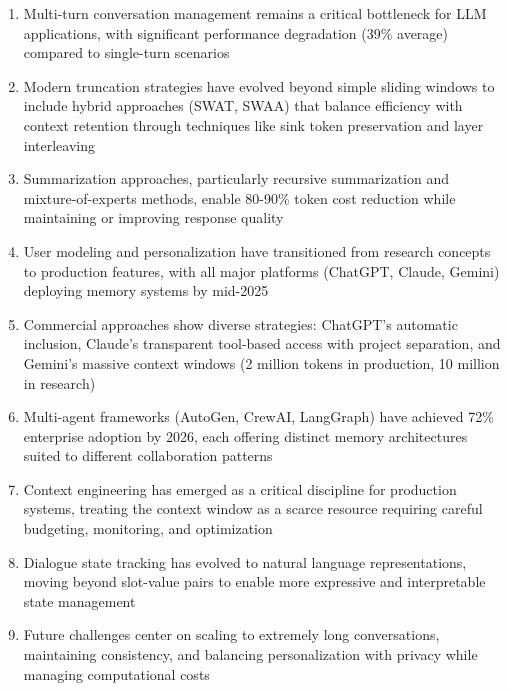 \documentclass[11pt,letterpaper]{article}
\begin{document}
\begin{enumerate}[leftmargin=*]
    \item Multi-turn conversation management remains a critical bottleneck for LLM applications, with significant performance degradation (39\% average) compared to single-turn scenarios

    \item Modern truncation strategies have evolved beyond simple sliding windows to include hybrid approaches (SWAT, SWAA) that balance efficiency with context retention through techniques like sink token preservation and layer interleaving

    \item Summarization approaches, particularly recursive summarization and mixture-of-experts methods, enable 80-90\% token cost reduction while maintaining or improving response quality

    \item User modeling and personalization have transitioned from research concepts to production features, with all major platforms (ChatGPT, Claude, Gemini) deploying memory systems by mid-2025

    \item Commercial approaches show diverse strategies: ChatGPT's automatic inclusion, Claude's transparent tool-based access with project separation, and Gemini's massive context windows (2 million tokens in production, 10 million in research)

    \item Multi-agent frameworks (AutoGen, CrewAI, LangGraph) have achieved 72\% enterprise adoption by 2026, each offering distinct memory architectures suited to different collaboration patterns

    \item Context engineering has emerged as a critical discipline for production systems, treating the context window as a scarce resource requiring careful budgeting, monitoring, and optimization

    \item Dialogue state tracking has evolved to natural language representations, moving beyond slot-value pairs to enable more expressive and interpretable state management

    \item Future challenges center on scaling to extremely long conversations, maintaining consistency, and balancing personalization with privacy while managing computational costs
\end{enumerate}
\end{document}
